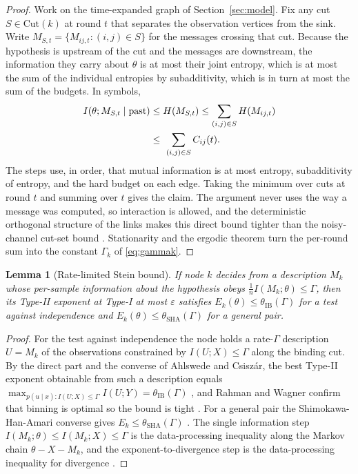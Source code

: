 \documentclass[journal]{IEEEtran}
\newtheorem{lemma}{Lemma}
\theoremstyle{definition}
\theoremstyle{remark}
\newcommand{\tib}{\theta_{\mathrm{IB}}}
\newcommand{\tsha}{\theta_{\mathrm{SHA}}}
\newcommand{\Gk}{\Gamma_k}
\begin{document}
\begin{proof}
Work on the time-expanded graph of Section~\ref{sec:model}. Fix any cut $S\in\mathrm{Cut}(k)$ at round $t$ that
separates the observation vertices from the sink. Write $M_{S,t}=\{M_{ij,t}:(i,j)\in S\}$ for the messages
crossing that cut. Because the hypothesis is upstream of the cut and the messages are downstream, the information
they carry about $\theta$ is at most their joint entropy, which is at most the sum of the individual entropies by
subadditivity, which is in turn at most the sum of the budgets. In symbols,
\begin{align}
I\!\left(\theta;M_{S,t}\mid \text{past}\right)
&\le H(M_{S,t}) \le \sum_{(i,j)\in S} H(M_{ij,t})\notag\\
&\le\ \sum_{(i,j)\in S} C_{ij}(t).
\end{align}
The steps use, in order, that mutual information is at most entropy, subadditivity of entropy, and the hard
budget on each edge. Taking the minimum over cuts at round $t$ and summing over $t$ gives the claim. The argument
never uses the way a message was computed, so interaction is allowed, and the deterministic orthogonal structure
of the links makes this direct bound tighter than the noisy-channel cut-set bound
\cite{elgamalkim2011,aclY2000}. Stationarity and the ergodic theorem turn the per-round sum into the constant
$\Gk$ of \eqref{eq:gammak}.
\end{proof}

\begin{lemma}[Rate-limited Stein bound]\label{lem:stein}
If node $k$ decides from a description $M_k$ whose per-sample information about the hypothesis obeys
$\tfrac1n I(M_k;\theta)\le\Gamma$, then its Type-II exponent at Type-I at most $\varepsilon$ satisfies
$E_k(\theta)\le\tib(\Gamma)$ for a test against independence and $E_k(\theta)\le\tsha(\Gamma)$ for a general pair.
\end{lemma}

\begin{proof}
For the test against independence the node holds a rate-$\Gamma$ description $U=M_k$ of the observations
constrained by $I(U;X)\le\Gamma$ along the binding cut. By the direct part and the converse of Ahlswede and
Csisz\'ar, the best Type-II exponent obtainable from such a description equals
$\max_{p(u\mid x):I(U;X)\le\Gamma} I(U;Y)=\tib(\Gamma)$ \cite{ahlswedecsiszar1986}, and Rahman and Wagner confirm
that binning is optimal so the bound is tight \cite{rahmanwagner2012}. For a general pair the Shimokawa-Han-Amari
converse gives $E_k\le\tsha(\Gamma)$ \cite{sha1994,han1987}. The single information step
$I(M_k;\theta)\le I(M_k;X)\le\Gamma$ is the data-processing inequality along the Markov chain
$\theta\!-\!X\!-\!M_k$, and the exponent-to-divergence step is the data-processing inequality for divergence
\cite{coverthomas2006,csiszarkorner2011}.
\end{proof}
\end{document}
